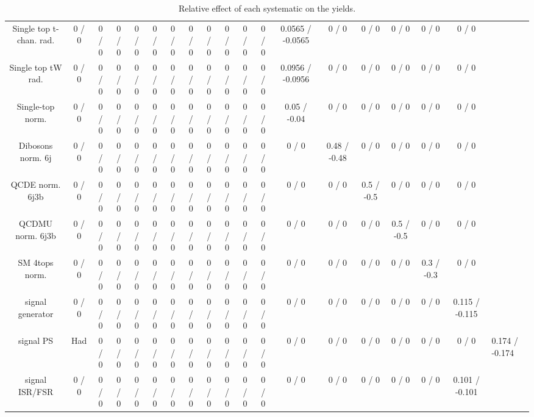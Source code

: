 \documentclass[10pt]{article}
\begin{document}
\begin{table}[htbp]
\begin{center}
\begin{tabular}{|c|c|c|c|c|c|c|c|c|c|c|c|c|c|c|c|c|c|}
  Single top t-chan. rad. & 0 / 0 & 0 / 0 & 0 / 0 & 0 / 0 & 0 / 0 & 0 / 0 & 0 / 0 & 0 / 0 & 0 / 0 & 0 / 0 & 0 / 0 & 0.0565 / -0.0565 & 0 / 0 & 0 / 0 & 0 / 0 & 0 / 0 & 0 / 0 \\ 
  Single top tW rad. & 0 / 0 & 0 / 0 & 0 / 0 & 0 / 0 & 0 / 0 & 0 / 0 & 0 / 0 & 0 / 0 & 0 / 0 & 0 / 0 & 0 / 0 & 0.0956 / -0.0956 & 0 / 0 & 0 / 0 & 0 / 0 & 0 / 0 & 0 / 0 \\ 
  Single-top norm. & 0 / 0 & 0 / 0 & 0 / 0 & 0 / 0 & 0 / 0 & 0 / 0 & 0 / 0 & 0 / 0 & 0 / 0 & 0 / 0 & 0 / 0 & 0.05 / -0.04 & 0 / 0 & 0 / 0 & 0 / 0 & 0 / 0 & 0 / 0 \\ 
  Dibosons norm. 6j & 0 / 0 & 0 / 0 & 0 / 0 & 0 / 0 & 0 / 0 & 0 / 0 & 0 / 0 & 0 / 0 & 0 / 0 & 0 / 0 & 0 / 0 & 0 / 0 & 0.48 / -0.48 & 0 / 0 & 0 / 0 & 0 / 0 & 0 / 0 \\ 
  QCDE norm. 6j3b & 0 / 0 & 0 / 0 & 0 / 0 & 0 / 0 & 0 / 0 & 0 / 0 & 0 / 0 & 0 / 0 & 0 / 0 & 0 / 0 & 0 / 0 & 0 / 0 & 0 / 0 & 0.5 / -0.5 & 0 / 0 & 0 / 0 & 0 / 0 \\ 
  QCDMU norm. 6j3b & 0 / 0 & 0 / 0 & 0 / 0 & 0 / 0 & 0 / 0 & 0 / 0 & 0 / 0 & 0 / 0 & 0 / 0 & 0 / 0 & 0 / 0 & 0 / 0 & 0 / 0 & 0 / 0 & 0.5 / -0.5 & 0 / 0 & 0 / 0 \\ 
  SM 4tops norm. & 0 / 0 & 0 / 0 & 0 / 0 & 0 / 0 & 0 / 0 & 0 / 0 & 0 / 0 & 0 / 0 & 0 / 0 & 0 / 0 & 0 / 0 & 0 / 0 & 0 / 0 & 0 / 0 & 0 / 0 & 0.3 / -0.3 & 0 / 0 \\ 
  signal generator & 0 / 0 & 0 / 0 & 0 / 0 & 0 / 0 & 0 / 0 & 0 / 0 & 0 / 0 & 0 / 0 & 0 / 0 & 0 / 0 & 0 / 0 & 0 / 0 & 0 / 0 & 0 / 0 & 0 / 0 & 0 / 0 & 0.115 / -0.115 \\ 
  signal PS & Had & 0 / 0 & 0 / 0 & 0 / 0 & 0 / 0 & 0 / 0 & 0 / 0 & 0 / 0 & 0 / 0 & 0 / 0 & 0 / 0 & 0 / 0 & 0 / 0 & 0 / 0 & 0 / 0 & 0 / 0 & 0 / 0 & 0.174 / -0.174 \\ 
  signal ISR/FSR & 0 / 0 & 0 / 0 & 0 / 0 & 0 / 0 & 0 / 0 & 0 / 0 & 0 / 0 & 0 / 0 & 0 / 0 & 0 / 0 & 0 / 0 & 0 / 0 & 0 / 0 & 0 / 0 & 0 / 0 & 0 / 0 & 0.101 / -0.101 \\ 
\hline 
\end{tabular} 
\caption{Relative effect of each systematic on the yields.} 
\end{center} 
\end{table} 
\end{document}
